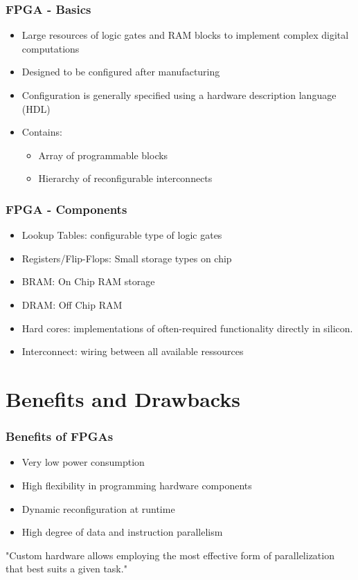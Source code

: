 \documentclass{beamer}
\begin{document}
\begin{frame}
	\frametitle{FPGA - Basics}
	\begin{itemize}
		\item Large resources of logic gates and RAM blocks to implement complex digital computations
		\item Designed to be configured after manufacturing
		\item Configuration is generally specified using a hardware description language (HDL)
		\item Contains:
			\begin{itemize} 
				\item Array of programmable blocks
				\item Hierarchy of reconfigurable interconnects
			\end{itemize}
	\end{itemize}
\end{frame}

\begin{frame}
	\frametitle{FPGA - Components}
	\begin{itemize}
		\item Lookup Tables: configurable type of logic gates
		\item Registers/Flip-Flops: Small storage types on chip
		\item BRAM: On Chip RAM storage
		\item DRAM: Off Chip RAM
		\item Hard cores: implementations of often-required functionality directly in silicon.
		\item Interconnect: wiring between all available ressources
	\end{itemize}
\end{frame}

\section{Benefits and Drawbacks}
\begin{frame}
	\frametitle{Benefits of FPGAs}
	\begin{itemize}
		\item Very low power consumption
		\item High flexibility in programming hardware components
		\item Dynamic reconfiguration at runtime
		\item High degree of data and instruction parallelism
	\end{itemize}
	
	\begin{center}
		"Custom hardware allows employing the most effective form of parallelization that best suits a given task."
	\end{center}
\end{frame}
\end{document}
